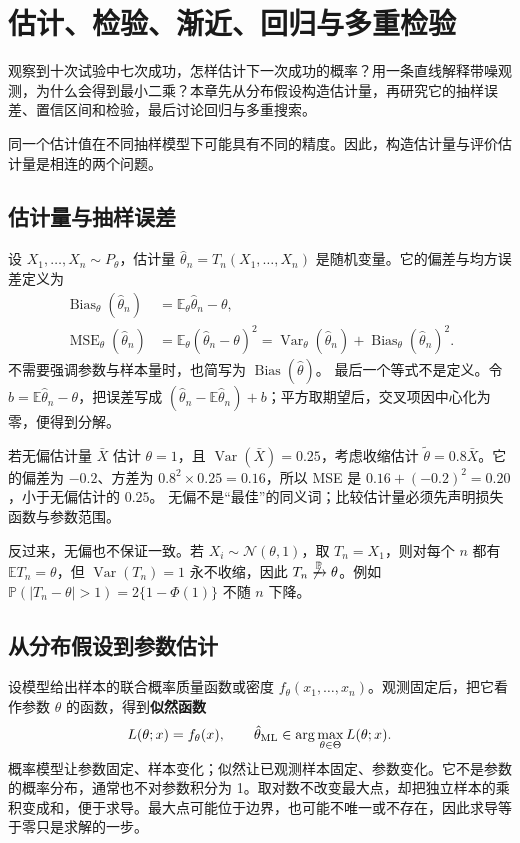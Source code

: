 \chapter{估计、检验、渐近、回归与多重检验}
\label{ch:statistical-inference}

观察到十次试验中七次成功，怎样估计下一次成功的概率？用一条直线解释带噪观测，为什么会得到最小二乘？本章先从分布假设构造估计量，再研究它的抽样误差、置信区间和检验，最后讨论回归与多重搜索。

同一个估计值在不同抽样模型下可能具有不同的精度。因此，构造估计量与评价估计量是相连的两个问题。

\section{估计量与抽样误差}

设 $X_1,\ldots,X_n\sim P_\theta$，估计量
$\hat\theta_n=T_n(X_1,\ldots,X_n)$ 是随机变量。它的偏差与均方误差定义为
\begin{align*}
 \operatorname{Bias}_\theta(\hat\theta_n)
 &=\mathbb E_\theta\hat\theta_n-\theta,\\
 \operatorname{MSE}_\theta(\hat\theta_n)
 &=\mathbb E_\theta(\hat\theta_n-\theta)^2
 =\operatorname{Var}_\theta(\hat\theta_n)
  +\operatorname{Bias}_\theta(\hat\theta_n)^2.
\end{align*}
不需要强调参数与样本量时，也简写为
$\operatorname{Bias}(\hat\theta)$。
最后一个等式不是定义。令
$b=\mathbb E\hat\theta_n-\theta$，把误差写成
$(\hat\theta_n-\mathbb E\hat\theta_n)+b$；平方取期望后，交叉项因中心化为零，便得到分解。

若无偏估计量 $\bar X$ 估计 $\theta=1$，且
$\operatorname{Var}(\bar X)=0.25$，考虑收缩估计
$\tilde\theta=0.8\bar X$。它的偏差为 $-0.2$、方差为
$0.8^2\times0.25=0.16$，所以 MSE 是
$0.16+(-0.2)^2=0.20$，小于无偏估计的 $0.25$。
无偏不是“最佳”的同义词；比较估计量必须先声明损失函数与参数范围。

反过来，无偏也不保证一致。若 $X_i\sim\mathcal N(\theta,1)$，取
$T_n=X_1$，则对每个 $n$ 都有 $\mathbb ET_n=\theta$，但
$\operatorname{Var}(T_n)=1$ 永不收缩，因此
$T_n\not\xrightarrow{\mathbb P}\theta$。例如 $\mathbb P(|T_n-\theta|>1)=2\{1-\Phi(1)\}$ 不随 $n$ 下降。

\section{从分布假设到参数估计}
\label{sec:likelihood-construction}

设模型给出样本的联合概率质量函数或密度 $f_\theta(x_1,\ldots,x_n)$。观测固定后，把它看作参数 $\theta$ 的函数，得到\textbf{似然函数}
\[
 L(\theta;x)=f_\theta(x),\qquad
 \hat\theta_{\rm ML}\in\arg\max_{\theta\in\Theta}L(\theta;x).
\]
概率模型让参数固定、样本变化；似然让已观测样本固定、参数变化。它不是参数的概率分布，通常也不对参数积分为 1。取对数不改变最大点，却把独立样本的乘积变成和，便于求导。最大点可能位于边界，也可能不唯一或不存在，因此求导等于零只是求解的一步。

